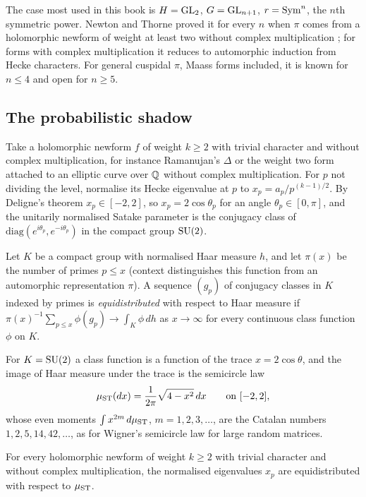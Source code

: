 The case most used in this book is $H=\mathrm{GL}_2$, $G=\mathrm{GL}_{n+1}$, $r=\operatorname{Sym}^n$, the $n$th symmetric power. Newton and Thorne proved it for every $n$ when $\pi$ comes from a holomorphic newform of weight at least two without complex multiplication \cite{newtonthorne2021,newtonthorne2021b}; for forms with complex multiplication it reduces to automorphic induction from Hecke characters. For general cuspidal $\pi$, Maass forms included, it is known for $n\le4$ \cite{gelbartjacquet1978,kimshahidi2002,kimsarnak2003} and open for $n\ge5$.

\subsection{The probabilistic shadow}

Take a holomorphic newform $f$ of weight $k\ge2$ with trivial character and without complex multiplication, for instance Ramanujan's $\Delta$ or the weight two form attached to an elliptic curve over $\mathbb{Q}$ without complex multiplication. For $p$ not dividing the level, normalise its Hecke eigenvalue at $p$ to $x_p=a_p/p^{(k-1)/2}$. By Deligne's theorem \cite{deligne1974} $x_p\in[-2,2]$, so $x_p=2\cos\theta_p$ for an angle $\theta_p\in[0,\pi]$, and the unitarily normalised Satake parameter is the conjugacy class of $\mathrm{diag}(e^{i\theta_p},e^{-i\theta_p})$ in the compact group $\mathrm{SU}(2)$.

\begin{definition}
Let $K$ be a compact group with normalised Haar measure $h$, and let $\pi(x)$ be the number of primes $p\le x$ (context distinguishes this function from an automorphic representation $\pi$). A sequence $(g_p)$ of conjugacy classes in $K$ indexed by primes is \emph{equidistributed} with respect to Haar measure if $\pi(x)^{-1}\sum_{p\le x}\phi(g_p)\to\int_K\phi\,dh$ as $x\to\infty$ for every continuous class function $\phi$ on $K$.
\end{definition}

For $K=\mathrm{SU}(2)$ a class function is a function of the trace $x=2\cos\theta$, and the image of Haar measure under the trace is the semicircle law
\[
\mu_{\mathrm{ST}}(dx)=\frac{1}{2\pi}\sqrt{4-x^2}\,dx\qquad\text{on }[-2,2],
\]
whose even moments $\int x^{2m}\,d\mu_{\mathrm{ST}}$, $m=1,2,3,\dots$, are the Catalan numbers $1,2,5,14,42,\dots$, as for Wigner's semicircle law for large random matrices.

\begin{theorem}\label{thm:01satotate}
For every holomorphic newform of weight $k\ge2$ with trivial character and without complex multiplication, the normalised eigenvalues $x_p$ are equidistributed with respect to $\mu_{\mathrm{ST}}$.
\end{theorem}

